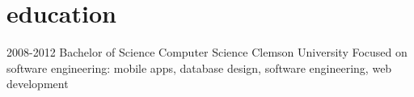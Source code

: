 
\section{education}

\begin{entrylist}


\entry
{2008-2012}
{Bachelor of Science {\normalfont Computer Science}}
{Clemson University}
{Focused on software engineering: mobile apps, database design, software engineering, web development}


\end{entrylist}
